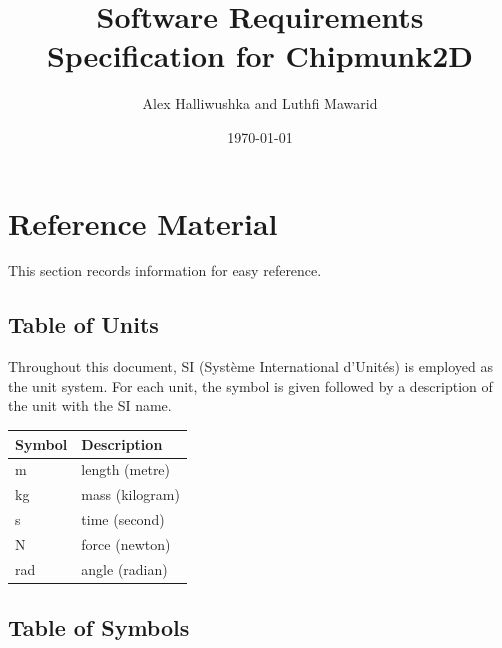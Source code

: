 \documentclass[12pt]{article}
\begin{document}
\title{Software Requirements Specification for Chipmunk2D} 
\author{Alex Halliwushka and Luthfi Mawarid}
\date{\today}
	
\maketitle

\tableofcontents


%
%

\section{Reference Material}

This section records information for easy reference.


\subsection{Table of Units} \label{TblOfUnits}

Throughout this document, SI (Syst\`{e}me International d'Unit\'{e}s) is employed
as the unit system. For each unit, the symbol is given followed by a
description of the unit with the SI name. \\

\begin{longtable*}{l l}
	\toprule
	Symbol & Description
	\\
	\midrule
	m & length (metre)
	\\
	kg & mass (kilogram)
	\\
	s & time (second)
	\\
	N & force (newton)
	\\
	rad & angle (radian)
	\\
	\bottomrule
	
\end{longtable*}


\subsection{Table of Symbols} \label{TblOfSym}
\end{document}

